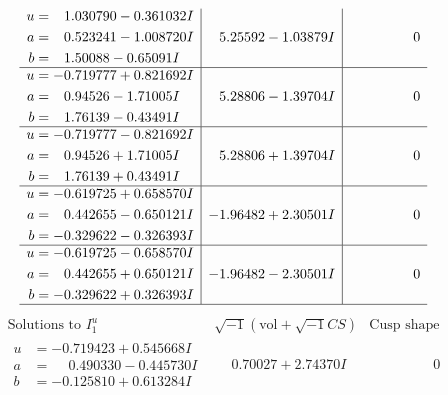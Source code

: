 \documentclass[1p]{elsarticle_modified}
\theoremstyle{definition}
\newcommand{\I}{\sqrt{-1}}
\begin{document}
$$\begin{array}{c|c|c}
\begin{aligned}
u &= \phantom{-}1.030790 - 0.361032 I \\
a &= \phantom{-}0.523241 - 1.008720 I \\
b &= \phantom{-}1.50088 - 0.65091 I\end{aligned}
 & \phantom{-}5.25592 - 1.03879 I & \phantom{-0.000000 } 0 \\ \hline\begin{aligned}
u &= -0.719777 + 0.821692 I \\
a &= \phantom{-}0.94526 - 1.71005 I \\
b &= \phantom{-}1.76139 - 0.43491 I\end{aligned}
 & \phantom{-}5.28806 - 1.39704 I & \phantom{-0.000000 } 0 \\ \hline\begin{aligned}
u &= -0.719777 - 0.821692 I \\
a &= \phantom{-}0.94526 + 1.71005 I \\
b &= \phantom{-}1.76139 + 0.43491 I\end{aligned}
 & \phantom{-}5.28806 + 1.39704 I & \phantom{-0.000000 } 0 \\ \hline\begin{aligned}
u &= -0.619725 + 0.658570 I \\
a &= \phantom{-}0.442655 - 0.650121 I \\
b &= -0.329622 - 0.326393 I\end{aligned}
 & -1.96482 + 2.30501 I & \phantom{-0.000000 } 0 \\ \hline\begin{aligned}
u &= -0.619725 - 0.658570 I \\
a &= \phantom{-}0.442655 + 0.650121 I \\
b &= -0.329622 + 0.326393 I\end{aligned}
 & -1.96482 - 2.30501 I & \phantom{-0.000000 } 0\\
 \hline 
 \end{array}$$\newpage$$\begin{array}{c|c|c}  
\text{Solutions to }I^u_{1}& \I (\text{vol} + \sqrt{-1}CS) & \text{Cusp shape}\\
 \hline 
\begin{aligned}
u &= -0.719423 + 0.545668 I \\
a &= \phantom{-}0.490330 - 0.445730 I \\
b &= -0.125810 + 0.613284 I\end{aligned}
 & \phantom{-}0.70027 + 2.74370 I & \phantom{-0.000000 } 0 \\ \hline\begin{aligned}

\end{aligned}
\end{array}$$
\end{document}
